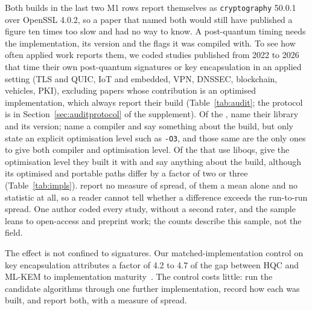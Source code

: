 Both builds in the last two M1 rows report themselves as
\texttt{cryptography} 50.0.1 over OpenSSL 4.0.2, so a paper that named both
would still have published a figure ten times too slow and had no way to know.
A post-quantum timing needs the implementation, its version and the flags it
was compiled with. To see how often applied work reports them, we coded \NauditN{} studies published from 2022 to 2026 that time their own post-quantum
signatures or key encapsulation in an applied setting (TLS and QUIC, IoT and
embedded, VPN, DNSSEC, blockchain, vehicles, PKI), excluding papers whose
contribution is an optimised implementation, which always report their build
(Table~\ref{tab:audit}; the protocol is in Section~\ref{sec:auditprotocol} of the supplement). Of the \NauditN, \NauditLib{} name their library and \NauditVer{} its version; \NauditCc{} name a compiler and \NauditFlags{} say something about the build, but only \NauditOlevel{} state an explicit optimisation level such as \texttt{-O3}, and those same \NauditBoth{} are the only ones to give both compiler and optimisation level. Of the \NauditOqs{} that use liboqs, \NauditOqsBuild{} give the optimisation level they built it with and \NauditOqsAny{} say anything about the build, although its optimised and portable paths differ by a factor of two or three (Table~\ref{tab:impls}). \NauditNoSpread{} report no measure of spread, \NauditMeanNoSpread{} of them a mean alone and \NauditNoStat{} no statistic at all, so a reader cannot tell whether a difference exceeds the run-to-run spread. One author coded every study, without a second rater, and the sample leans to open-access and preprint work; the counts describe this sample, not the field.

The effect is not confined to signatures. Our matched-implementation control
on key encapsulation attributes a factor of 4.2 to 4.7 of the gap between HQC
and ML-KEM to implementation maturity~\cite{alfarajat2026hqc}. The control
costs little: run the candidate algorithms through one further
implementation, record how each was built, and report both, with a measure
of spread.
